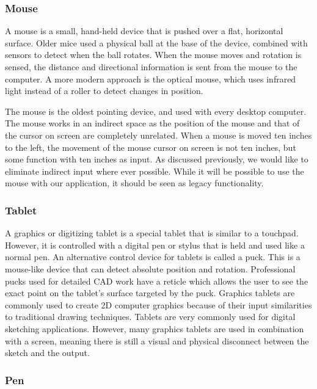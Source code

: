  \subsubsection{Mouse}
 A mouse is a small, hand-held device that is pushed over a flat, horizontal surface.
 Older mice used a physical ball at the base of the device, combined with sensors to detect when the ball rotates.
 When the mouse moves and rotation is sensed, the distance and directional information is sent from the mouse to the computer.
 A more modern approach is the optical mouse, which uses infrared light instead of a roller to detect changes in position.
 
 The mouse is the oldest pointing device, and used with every desktop computer.
 The mouse works in an indirect space as the position of the mouse and that of the cursor on screen are completely unrelated.
 When a mouse is moved ten inches to the left, the movement of the mouse cursor on screen is not ten inches, but some function with ten inches as input.
 As discussed previously, we would like to eliminate indirect input where ever possible.
 While it will be possible to use the mouse with our application, it should be seen as legacy functionality.

 \subsubsection{Tablet}
 A graphics or digitizing tablet is a special tablet that is similar to a touchpad. 
 However, it is controlled with a digital pen or stylus that is held and used like a normal pen.
 An alternative control device for tablets is called a puck. 
 This is a mouse-like device that can detect absolute position and rotation.
 Professional pucks used for detailed CAD work have a reticle which allows the user to see the exact point on the tablet's surface targeted by the puck.
 Graphics tablets are commonly used to create 2D computer graphics because of their input similarities to traditional drawing techniques.
 Tablets are very commonly used for digital sketching applications.
 However, many graphics tablets are used in combination with a screen, meaning there is still a visual and physical disconnect between the sketch and the output.
 
 \subsubsection{Pen}
 
